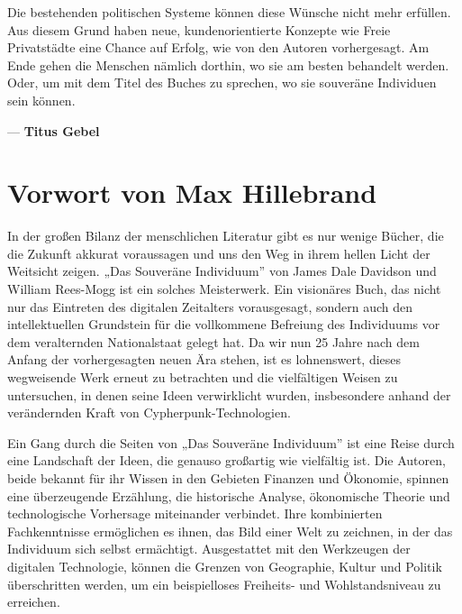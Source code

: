 \documentclass[
  a5paper,
  smalldemyvopaper,10pt,twoside,onecolumn,openright,extrafontsizes,hidelinks]{memoir}
\begin{document}
Die bestehenden politischen Systeme können diese Wünsche nicht mehr
erfüllen. Aus diesem Grund haben neue, kundenorientierte Konzepte wie
Freie Privatstädte eine Chance auf Erfolg, wie von den Autoren
vorhergesagt. Am Ende gehen die Menschen nämlich dorthin, wo sie am
besten behandelt werden. Oder, um mit dem Titel des Buches zu sprechen,
wo sie souveräne Individuen sein können.

\vspace{2em}

--- \textbf{Titus Gebel}


\chapter*{Vorwort von Max Hillebrand}\label{vorwort-von-max-hillebrand}


In der großen Bilanz der menschlichen Literatur gibt es nur wenige
Bücher, die die Zukunft akkurat voraussagen und uns den Weg in ihrem
hellen Licht der Weitsicht zeigen. „Das Souveräne Individuum'' von James
Dale Davidson und William Rees-Mogg ist ein solches Meisterwerk. Ein
visionäres Buch, das nicht nur das Eintreten des digitalen Zeitalters
vorausgesagt, sondern auch den intellektuellen Grundstein für die
vollkommene Befreiung des Individuums vor dem veralternden Nationalstaat
gelegt hat. Da wir nun 25 Jahre nach dem Anfang der vorhergesagten neuen
Ära stehen, ist es lohnenswert, dieses wegweisende Werk erneut zu
betrachten und die vielfältigen Weisen zu untersuchen, in denen seine
Ideen verwirklicht wurden, insbesondere anhand der verändernden Kraft
von Cypherpunk-Technologien.

Ein Gang durch die Seiten von „Das Souveräne Individuum'' ist eine Reise
durch eine Landschaft der Ideen, die genauso großartig wie vielfältig
ist. Die Autoren, beide bekannt für ihr Wissen in den Gebieten Finanzen
und Ökonomie, spinnen eine überzeugende Erzählung, die historische
Analyse, ökonomische Theorie und technologische Vorhersage miteinander
verbindet. Ihre kombinierten Fachkenntnisse ermöglichen es ihnen, das
Bild einer Welt zu zeichnen, in der das Individuum sich selbst
ermächtigt. Ausgestattet mit den Werkzeugen der digitalen Technologie,
können die Grenzen von Geographie, Kultur und Politik überschritten
werden, um ein beispielloses Freiheits- und Wohlstandsniveau zu
erreichen.
\end{document}
